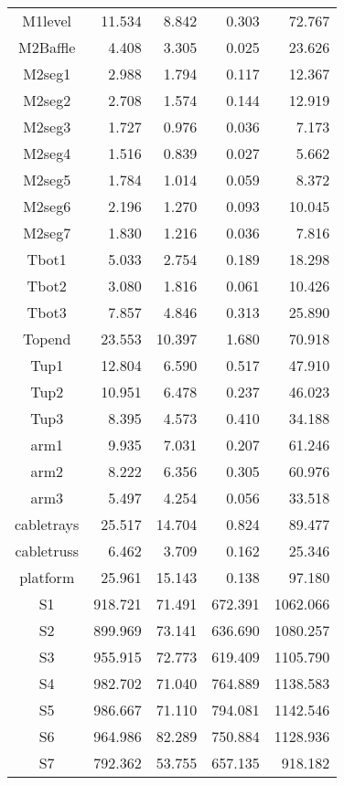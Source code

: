 \begin{longtable}{crrrr}
 M1level & 11.534 & 8.842 & 0.303 & 72.767 \\
 M2Baffle & 4.408 & 3.305 & 0.025 & 23.626 \\
 M2seg1 & 2.988 & 1.794 & 0.117 & 12.367 \\
 M2seg2 & 2.708 & 1.574 & 0.144 & 12.919 \\
 M2seg3 & 1.727 & 0.976 & 0.036 & 7.173 \\
 M2seg4 & 1.516 & 0.839 & 0.027 & 5.662 \\
 M2seg5 & 1.784 & 1.014 & 0.059 & 8.372 \\
 M2seg6 & 2.196 & 1.270 & 0.093 & 10.045 \\
 M2seg7 & 1.830 & 1.216 & 0.036 & 7.816 \\
 Tbot1 & 5.033 & 2.754 & 0.189 & 18.298 \\
 Tbot2 & 3.080 & 1.816 & 0.061 & 10.426 \\
 Tbot3 & 7.857 & 4.846 & 0.313 & 25.890 \\
 Topend & 23.553 & 10.397 & 1.680 & 70.918 \\
 Tup1 & 12.804 & 6.590 & 0.517 & 47.910 \\
 Tup2 & 10.951 & 6.478 & 0.237 & 46.023 \\
 Tup3 & 8.395 & 4.573 & 0.410 & 34.188 \\
 arm1 & 9.935 & 7.031 & 0.207 & 61.246 \\
 arm2 & 8.222 & 6.356 & 0.305 & 60.976 \\
 arm3 & 5.497 & 4.254 & 0.056 & 33.518 \\
 cabletrays & 25.517 & 14.704 & 0.824 & 89.477 \\
 cabletruss & 6.462 & 3.709 & 0.162 & 25.346 \\
 platform & 25.961 & 15.143 & 0.138 & 97.180 \\
 S1 & 918.721 & 71.491 & 672.391 & 1062.066 \\
 S2 & 899.969 & 73.141 & 636.690 & 1080.257 \\
 S3 & 955.915 & 72.773 & 619.409 & 1105.790 \\
 S4 & 982.702 & 71.040 & 764.889 & 1138.583 \\
 S5 & 986.667 & 71.110 & 794.081 & 1142.546 \\
 S6 & 964.986 & 82.289 & 750.884 & 1128.936 \\
 S7 & 792.362 & 53.755 & 657.135 & 918.182 \\
\bottomrule
\end{longtable}


